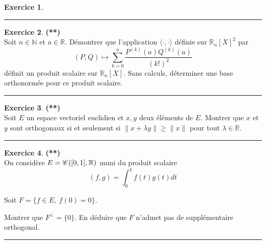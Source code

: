 \documentclass[a4paper,11pt]{article}
\theoremstyle{definition}
\newtheorem{exo}{Exercice} %
\begin{document}
\begin{minipage}{1\linewidth}
\begin{minipage}[t]{0.48\linewidth}
\begin{exo}
			\centering\rule{1\linewidth}{0.6pt}\end{exo}
		
		
				
		\begin{exo}\textbf{(**)}\quad\\[0.2cm]
			Soit $n\in\mathbb N$ et $a\in\mathbb R$. Démontrer que l'application $\langle \cdot,\cdot\rangle$ définie sur $\mathbb R_n[X]^2$ par 
			$$(P,Q)\mapsto \sum_{k=0}^n \frac{P^{(k)}(a)Q^{(k)}(a)}{(k!)^2}$$
			\noindent définit un produit scalaire sur $\mathbb R_n[X]$. Sans calculs, déterminer une base orthonormée pour ce produit scalaire.
			
			
			\centering\rule{1\linewidth}{0.6pt}\end{exo}
		
		
		
		
		
	\end{minipage}\hfill\vrule\hfill\begin{minipage}[t]{0.48\linewidth}\raggedright
		
				
		\begin{exo}\textbf{(**)}\quad\\[0.2cm]
			Soit $E$ un espace vectoriel euclidien et $x,y$ deux éléments de $E$. Montrer que $x$ et $y$ sont orthogonaux si et seulement si $\|x+\lambda y\|\geq \|x\|$ pour tout $\lambda\in\mathbb R$.
			
			\centering\rule{1\linewidth}{0.6pt}\end{exo}
		
		
				
		\begin{exo}\textbf{(**)}\quad\\[0.2cm]
			On considère $E=\mathscr{C}([0,1],\mathbb{R})$ muni du produit scalaire $$(f,g)=\int_0^1 f(t)g(t)dt$$
			
			Soit $F=\{f\in E,\ f(0)=0\}$.
			
			Montrer que $F^\perp=\{0\}$. En déduire que $F$ n'admet pas
			de supplémentaire orthogonal.
			
			\centering\rule{1\linewidth}{0.6pt}\end{exo}
	

\end{minipage}
\end{minipage}
\end{document}
